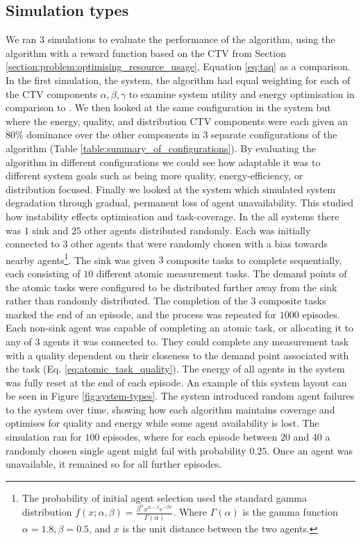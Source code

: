 \subsection{Simulation types}
We ran $3$ simulations to evaluate the performance of the algorithm, using the \acronymQRouting{}{} algorithm \citep{Boyan} with a reward function based on the CTV from Section \ref{section:problem:optimising_resource_usage}, Equation \ref{eq:taq} as a comparison. In the first simulation, the \simulationSimple{}{} system,  the \acronymWSNOptimisation{}{} algorithm had
equal weighting for each of the CTV components $\alpha, \beta, \gamma$ to examine system utility and energy optimisation in comparison to \acronymQRouting{}{}.  We then looked at the same configuration in the \simulationExtended{}{} system but where the energy, quality, and distribution CTV components were each given an $80\%$ dominance over the other components in $3$ separate configurations of the algorithm (Table \ref{table:summary_of_configurations}). By evaluating the algorithm in different configurations we could see how adaptable it was to different system goals such as being more quality, energy-efficiency, or distribution focused. Finally we looked at the \simulationNodeFailure{}{} system which simulated system degradation through gradual, permanent loss of agent unavailability. This studied how instability effects optimisation and task-coverage.  
In the all systems there was  $1$ sink and $25$ other agents distributed randomly. Each was initially connected to $3$ other agents that were randomly chosen with a bias towards nearby agents\footnote{The probability of initial agent selection used the standard gamma distribution $f(x; \alpha, \beta) = \frac{\beta^{\alpha} x^{\alpha-1}e^{- \beta x}}   {\Gamma(\alpha)}$. Where  $\Gamma(\alpha)$ is the  gamma function $\alpha=1.8, \beta=0.5$, and $x$ is the unit distance between the two agents.}. 
The sink was given $3$ composite tasks to complete sequentially, each consisting of $10$ different atomic measurement tasks. The demand points of the atomic tasks were configured to be distributed further away from the sink rather than randomly distributed. The completion of the $3$ composite tasks marked the end of an episode, and the process was repeated for $1000$ episodes. Each non-sink agent was capable of completing an atomic task, or allocating it to any of $3$ agents it was connected to. They could complete any measurement task with a quality dependent on their closeness to the demand point associated with the task (Eq. \ref{eq:atomic_task_quality}). The energy of all agents in the system was fully reset at the end of each episode. An example of this system layout can be seen in Figure \ref{fig:system-types}.  The \simulationNodeFailure{}{} system introduced random agent failures to the system over time, showing how each algorithm maintains coverage and optimises for quality and energy while some agent availability is lost. The simulation ran for $100$ episodes, where for each episode between $20$ and $40$  a randomly chosen single agent might fail with probability $0.25$. Once an agent was unavailable, it remained so for all further episodes. 

 
